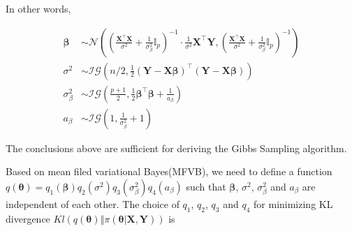 \documentclass[12pt]{article}
\begin{document}
In other words,

\begin{align*}
	\bm{\beta} &\sim \mathcal{N}\left(\left(\frac{\bm{X}^\top \bm{X}}{\sigma^2} + \frac{1}{\sigma_{\beta}^2} \mathbb{I}_{p} \right)^{-1} \cdot \frac{1}{\sigma^2}\bm{X}^\top \bm{Y},  \left(\frac{\bm{X}^\top \bm{X}}{\sigma^2} + \frac{1}{\sigma_{\beta}^2} \mathbb{I}_{p} \right)^{-1} \right)\\
	\sigma^2 & \sim \mathcal{IG}\left(n/2, \frac{1}{2} (\bm{Y} - \bm{X}\bm{\beta})^\top (\bm{Y} - \bm{X}\bm{\beta}) \right) \\
	\sigma_{\beta}^2 & \sim \mathcal{IG}\left( \frac{p+1}{2}, \frac{1}{2}\bm{\beta}^\top \bm{\beta} + \frac{1}{a_\beta} \right)\\
	a_\beta &\sim \mathcal{IG}\left(1, \frac{1}{\sigma_{\beta}^2} + 1  \right)
\end{align*}


The conclusions above are sufficient for deriving the Gibbs Sampling algorithm.

Based on mean filed variational Bayes(MFVB), we need to define a function $q(\bm{\theta}) = q_1(\bm{\beta})q_2(\sigma^2)q_3(\sigma_{\beta}^2)q_4(a_\beta)$ such that $\bm{\beta}$, $\sigma^2$, $\sigma_{\beta}^2$ and $a_\beta$ are independent of each other. The choice of $q_1$, $q_2$, $q_3$ and $q_4$ for minimizing KL divergence $Kl\left(\left. q(\bm{\theta}) \right\Vert \pi(\left.\bm{\theta}\right\vert \bm{X}, \bm{Y})\right)$ is
\end{document}
